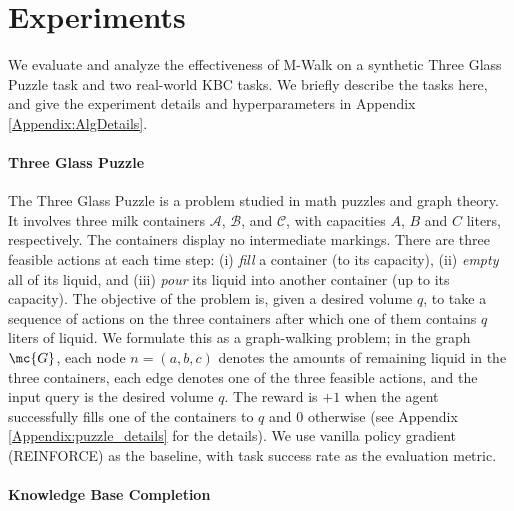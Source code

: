 \documentclass{article}
\begin{document}
	
	\section{Experiments}
	\label{Sec:Experiments}

	We evaluate and analyze the effectiveness of M-Walk on a synthetic Three Glass Puzzle task and two real-world KBC tasks. We briefly describe the tasks here, and give the experiment details and hyperparameters in Appendix \ref{Appendix:AlgDetails}. 
	
	\paragraph{Three Glass Puzzle} The Three Glass Puzzle \cite{ore1990graphs} is a problem studied in math puzzles and graph theory. It involves three milk containers $\mathcal{A}$, $\mathcal{B}$, and $\mathcal{C}$, with capacities $A$, $B$ and $C$ liters, respectively. The containers display no intermediate markings. There are three feasible actions at each time step: (i) \emph{fill} a container (to its capacity),  (ii) \emph{empty} all of its liquid, and (iii) \emph{pour} its liquid into another container (up to its capacity). The objective of the problem is, given a desired volume $q$, to take a sequence of actions on the three containers after which one of them contains $q$ liters of liquid. We formulate this as a graph-walking problem; in the graph $\mc{G}$, each node $n=(a,b,c)$ denotes the amounts of remaining liquid in the three containers, each edge denotes one of the three feasible actions, and the input query is the desired volume $q$. The reward is $+1$ when the agent successfully fills one of the containers to $q$ and $0$ otherwise (see Appendix \ref{Appendix:puzzle_details} for the details).
	We use vanilla policy gradient (REINFORCE) \cite{williams1992simple} as the baseline, with task success rate as the evaluation metric.
	
	\paragraph{Knowledge Base Completion}
    
\end{document}
